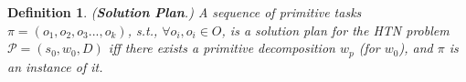 \documentclass[letterpaper]{article} %
\newtheorem{definition}{Definition}
\begin{document}



\begin{definition} \label{def:htn-sol-plan}
(\textbf{Solution Plan}.) 
{A sequence of primitive tasks $\pi=(o_1,o_2,o_3...,o_k)$, s.t., $\forall o_i, o_i \in O$, is a solution plan for the HTN problem $\mathcal{P}=(s_0,w_0,D)$ iff there exists a primitive decomposition $w_p$ (for $w_0$), and $\pi$ is an instance of it. 
}  
\end{definition}

\end{document}
